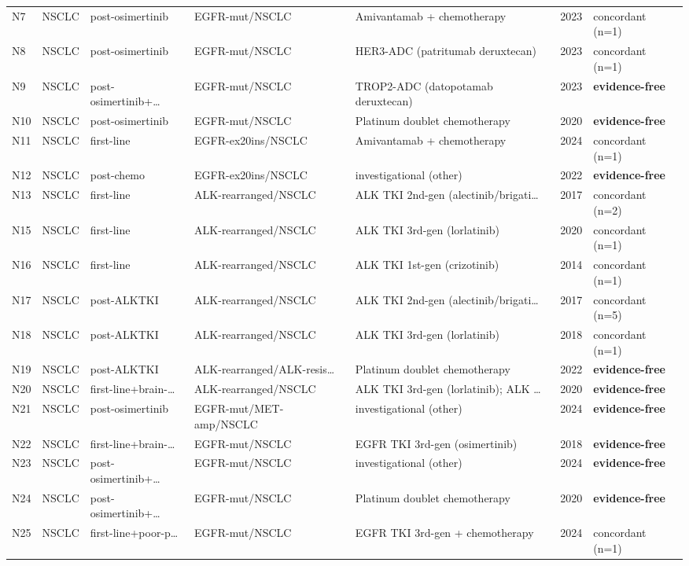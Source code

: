 \begin{table}[H]
\begin{tabular}{@{}p{}p{}p{}p{}p{}p{}p{}@{}}
N7 & NSCLC & post-osimertinib & EGFR-mut/NSCLC & Amivantamab + chemotherapy & 2023 & concordant (n=1) \\
N8 & NSCLC & post-osimertinib & EGFR-mut/NSCLC & HER3-ADC (patritumab deruxtecan) & 2023 & concordant (n=1) \\
N9 & NSCLC & post-osimertinib+… & EGFR-mut/NSCLC & TROP2-ADC (datopotamab deruxtecan) & 2023 & \textbf{evidence-free} \\
N10 & NSCLC & post-osimertinib & EGFR-mut/NSCLC & Platinum doublet chemotherapy & 2020 & \textbf{evidence-free} \\
N11 & NSCLC & first-line & EGFR-ex20ins/NSCLC & Amivantamab + chemotherapy & 2024 & concordant (n=1) \\
N12 & NSCLC & post-chemo & EGFR-ex20ins/NSCLC & investigational (other) & 2022 & \textbf{evidence-free} \\
N13 & NSCLC & first-line & ALK-rearranged/NSCLC & ALK TKI 2nd-gen (alectinib/brigati… & 2017 & concordant (n=2) \\
N15 & NSCLC & first-line & ALK-rearranged/NSCLC & ALK TKI 3rd-gen (lorlatinib) & 2020 & concordant (n=1) \\
N16 & NSCLC & first-line & ALK-rearranged/NSCLC & ALK TKI 1st-gen (crizotinib) & 2014 & concordant (n=1) \\
N17 & NSCLC & post-ALKTKI & ALK-rearranged/NSCLC & ALK TKI 2nd-gen (alectinib/brigati… & 2017 & concordant (n=5) \\
N18 & NSCLC & post-ALKTKI & ALK-rearranged/NSCLC & ALK TKI 3rd-gen (lorlatinib) & 2018 & concordant (n=1) \\
N19 & NSCLC & post-ALKTKI & ALK-rearranged/ALK-resis… & Platinum doublet chemotherapy & 2022 & \textbf{evidence-free} \\
N20 & NSCLC & first-line+brain-… & ALK-rearranged/NSCLC & ALK TKI 3rd-gen (lorlatinib); ALK … & 2020 & \textbf{evidence-free} \\
N21 & NSCLC & post-osimertinib & EGFR-mut/MET-amp/NSCLC & investigational (other) & 2024 & \textbf{evidence-free} \\
N22 & NSCLC & first-line+brain-… & EGFR-mut/NSCLC & EGFR TKI 3rd-gen (osimertinib) & 2018 & \textbf{evidence-free} \\
N23 & NSCLC & post-osimertinib+… & EGFR-mut/NSCLC & investigational (other) & 2024 & \textbf{evidence-free} \\
N24 & NSCLC & post-osimertinib+… & EGFR-mut/NSCLC & Platinum doublet chemotherapy & 2020 & \textbf{evidence-free} \\
N25 & NSCLC & first-line+poor-p… & EGFR-mut/NSCLC & EGFR TKI 3rd-gen + chemotherapy & 2024 & concordant (n=1) \\
\bottomrule
\end{tabular}
\end{table}
